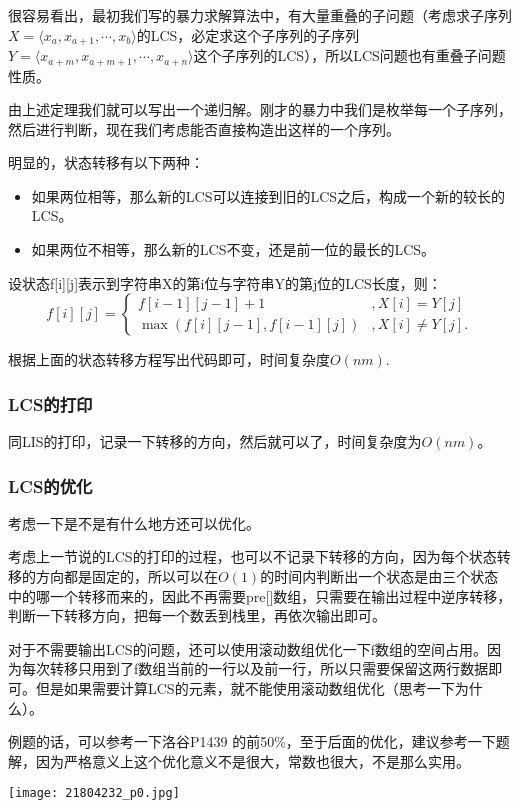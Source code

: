 很容易看出，最初我们写的暴力求解算法中，有大量重叠的子问题（考虑求子序列$X = \langle x_a, x_{a+1}, \cdots, x_b\rangle$的LCS，必定求这个子序列的子序列$Y = \langle x_{a+m}, x_{a+m+1}, \cdots, x_{a+n}\rangle$这个子序列的LCS），所以LCS问题也有重叠子问题性质。

由上述定理我们就可以写出一个递归解。刚才的暴力中我们是枚举每一个子序列，然后进行判断，现在我们考虑能否直接构造出这样的一个序列。

明显的，状态转移有以下两种：
\begin{itemize}
	\item{如果两位相等，那么新的LCS可以连接到旧的LCS之后，构成一个新的较长的LCS。}
	\item{如果两位不相等，那么新的LCS不变，还是前一位的最长的LCS。}
\end{itemize}
设状态f[i][j]表示到字符串X的第i位与字符串Y的第j位的LCS长度，则：
\begin{equation*}
	f[i][j]=\begin{cases}
		f[i-1][j-1]+1             & , X[i]=Y[j]     \\
		\max(f[i][j-1],f[i-1][j]) & , X[i]\neq Y[j].
	\end{cases}
\end{equation*}

根据上面的状态转移方程写出代码即可，时间复杂度$O(nm)$.
\subsubsection{LCS的打印}
同LIS的打印，记录一下转移的方向，然后就可以了，时间复杂度为$O(nm)$。
\subsubsection{LCS的优化}
考虑一下是不是有什么地方还可以优化。

考虑上一节说的LCS的打印的过程，也可以不记录下转移的方向，因为每个状态转移的方向都是固定的，所以可以在$O(1)$的时间内判断出一个状态是由三个状态中的哪一个转移而来的，因此不再需要pre[]数组，只需要在输出过程中逆序转移，判断一下转移方向，把每一个数丢到栈里，再依次输出即可。

对于不需要输出LCS的问题，还可以使用滚动数组优化一下f数组的空间占用。因为每次转移只用到了f数组当前的一行以及前一行，所以只需要保留这两行数据即可。但是如果需要计算LCS的元素，就不能使用滚动数组优化（思考一下为什么）。

例题的话，可以参考一下洛谷P1439 的前50\%，至于后面的优化，建议参考一下题解，因为严格意义上这个优化意义不是很大，常数也很大，不是那么实用。
\begin{center}\texttt{[image: 21804232\_p0.jpg]}\end{center}
\note
